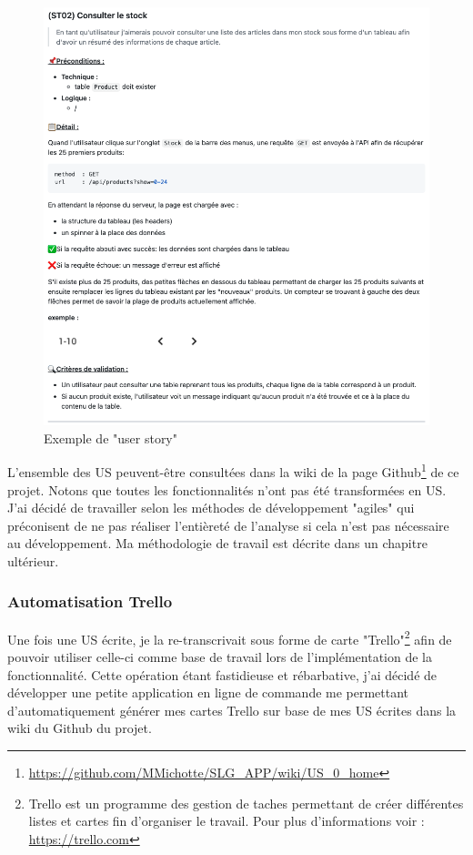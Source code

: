 \begin{figure}[H]
  \centering
  \includegraphics[width=\textwidth]{img/exemple_us.png}
  \caption{Exemple de "user story"}
\end{figure}

L'ensemble des US peuvent-être consultées dans la wiki de la page Github\footnote{\url {https://github.com/MMichotte/SLG_APP/wiki/US_0_home}} de ce projet. 
Notons que toutes les fonctionnalités n'ont pas été transformées en US. J'ai décidé de travailler selon les méthodes de développement "agiles" qui préconisent de ne pas réaliser l'entièreté de l'analyse si cela n'est pas nécessaire au développement. Ma méthodologie de travail est décrite dans un chapitre ultérieur. 

\newpage

\subsubsection{Automatisation Trello}
Une fois une US écrite, je la re-transcrivait sous forme de carte "Trello"\footnote{Trello est un programme des gestion de taches permettant de créer différentes listes et cartes fin d'organiser le travail. Pour plus d'informations voir : \url{https://trello.com}} afin de pouvoir utiliser celle-ci comme base de travail lors de l'implémentation de la fonctionnalité. Cette opération étant fastidieuse et rébarbative, j'ai décidé de développer une petite application en ligne de commande me permettant d'automatiquement générer mes cartes Trello sur base de mes US écrites dans la wiki du Github du projet. 

